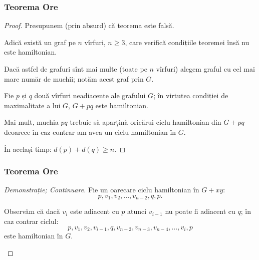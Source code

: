 \begin{frame}
  \frametitle{Teorema Ore}

\begin{proof}

Presupunem (prin absurd) că teorema este falsă.\pause

Adică există un graf pe $n$ vîrfuri, $n\geq 3$, care verifică condițiile teoremei însă nu este hamiltonian.\pause

Dacă astfel de grafuri sînt mai multe (toate pe $n$ vîrfuri) alegem graful cu cel mai mare număr de muchii; notăm acest graf prin $G$.\pause

Fie $p$ și $q$ două vîrfuri neadiacente ale grafului $G$; în virtutea condiției de maximalitate a lui $G$, $G+pq$ este hamiltonian.\pause

Mai mult, muchia $pq$ trebuie să aparțină oricărui ciclu hamiltonian din $G+pq$ deoarece în caz contrar am avea un ciclu hamiltonian în $G$.\pause

În același timp: $d(p)+d(q)\geq n$.

\end{proof}


\end{frame}

\begin{frame}
  \frametitle{Teorema Ore}

\begin{proof}[Demonstrație; Continuare]

Fie un oarecare ciclu hamiltonian în $G+xy$:
\begin{equation}\label{demonstratia-teoremei-lui-ore-ciclu-hamilton-alest-arbitrar}
  p,v_1,v_2,...,v_{n-2},q,p.
\end{equation}\pause

Observăm că dacă $v_i$ este adiacent cu $p$ atunci $v_{i-1}$ nu poate fi adiacent cu $q$; în caz contrar ciclul:
\[
  p,v_1,v_2,v_{i-1},q,v_{n-2},v_{n-3},v_{n-4},...,v_{i},p
\]
este hamiltonian în $G$.\pause

\begin{figure}
\centering%
\end{figure}


\end{proof}

\end{frame}



